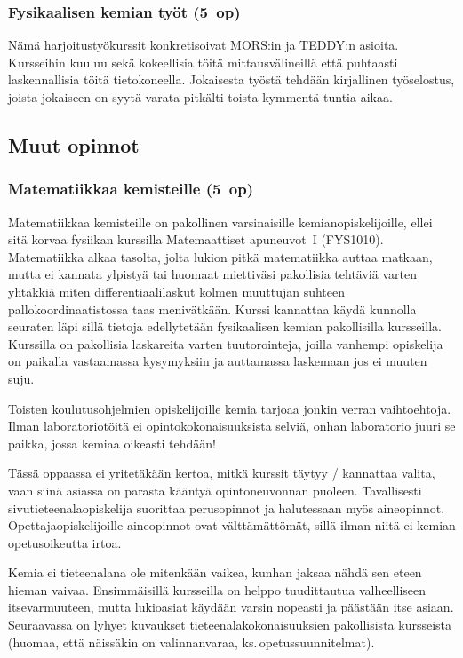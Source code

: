\documentclass[../ala_hataile.tex]{subfiles}
\begin{document}
	\subsubsection*{Fysikaalisen kemian työt (5~op)}
	Nämä harjoitustyökurssit konkretisoivat
	MORS:in ja TEDDY:n asioita. Kursseihin
	kuuluu sekä kokeellisia töitä mittausvälineillä
	että puhtaasti laskennallisia töitä
	tietokoneella. Jokaisesta työstä tehdään
	kirjallinen työselostus, joista jokaiseen on
	syytä varata pitkälti toista kymmentä tuntia
	aikaa.
	
	\subsection*{Muut opinnot}
	\subsubsection*{Matematiikkaa kemisteille (5~op)}
	Matematiikkaa kemisteille on pakollinen
	varsinaisille kemian\-opiskelijoille, ellei sitä korvaa fysiikan kurssilla Matemaattiset apuneuvot~I (FYS1010). Matematiikka alkaa tasolta, jolta lukion pitkä matematiikka auttaa matkaan, mutta ei kannata
	ylpistyä tai huomaat miettiväsi pakollisia
	tehtäviä varten yhtäkkiä miten differentiaali\-laskut kolmen muuttujan suhteen pallo\-koordinaatistossa
	taas menivätkään. Kurssi
	kannattaa käydä kunnolla seuraten läpi sillä
	tietoja edellytetään fysikaalisen kemian pakollisilla
	kursseilla. Kurssilla on pakollisia
	laskareita varten tuutorointeja, joilla vanhempi
	opiskelija on paikalla vastaamassa
	kysymyksiin ja auttamassa laskemaan jos
	ei muuten suju.
	
	Toisten koulutusohjelmien opiskelijoille kemia tarjoaa jonkin verran vaihtoehtoja. Ilman laboratoriotöitä
	ei opintokokonaisuuksista selviä,
	onhan laboratorio juuri se paikka, jossa
	kemiaa oikeasti tehdään! 
	
	Tässä oppaassa
	ei yritetäkään kertoa, mitkä kurssit täytyy
	/ kannattaa valita, vaan siinä asiassa on
	parasta kääntyä opinto\-neuvonnan puoleen. Tavallisesti sivu\-tieteen\-ala\-opiskelija
	suorittaa perusopinnot ja halutessaan myös
	aine\-opinnot. Opettajaopiskelijoille aine\-opinnot
	ovat välttämättömät, sillä ilman
	niitä ei kemian opetusoikeutta irtoa.
	
	Kemia ei tieteenalana ole mitenkään vaikea,
	kunhan jaksaa nähdä sen eteen hieman
	vaivaa. Ensimmäisillä kursseilla on helppo
	tuudittautua valheelliseen itsevarmuuteen,
	mutta lukioasiat käydään varsin nopeasti
	ja päästään itse asiaan. Seuraavassa on lyhyet
	kuvaukset tieteen\-ala\-kokonaisuuksien
	pakollisista kursseista (huomaa, että näissäkin
	on valinnanvaraa, ks.\,opetussuunnitelmat).
\end{document}
